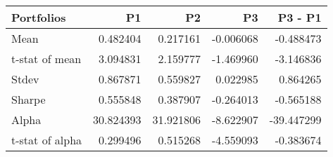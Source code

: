 \begin{tabular}{lrrrr}
\toprule
Portfolios & P1 & P2 & P3 & P3 - P1 \\
\midrule
Mean & 0.482404 & 0.217161 & -0.006068 & -0.488473 \\
t-stat of mean & 3.094831 & 2.159777 & -1.469960 & -3.146836 \\
Stdev & 0.867871 & 0.559827 & 0.022985 & 0.864265 \\
Sharpe & 0.555848 & 0.387907 & -0.264013 & -0.565188 \\
Alpha & 30.824393 & 31.921806 & -8.622907 & -39.447299 \\
t-stat of alpha & 0.299496 & 0.515268 & -4.559093 & -0.383674 \\
\bottomrule
\end{tabular}

